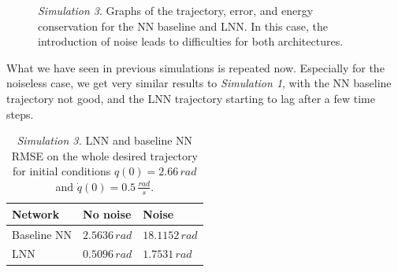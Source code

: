 \documentclass[a4paper]{article}
\begin{document}
\begin{figure}
    \centering
    \qquad
    \caption{\textit{Simulation 3}. Graphs of the trajectory, error, and energy conservation for the NN baseline and LNN. In this case, the introduction of noise leads to difficulties for both architectures.}
    \label{fig:rigid_150degrees_05rads}
\end{figure}

What we have seen in previous simulations is repeated now. Especially for the noiseless case, we get very similar results to \textit{Simulation 1}, with the NN baseline trajectory not good, and the LNN trajectory starting to lag after a few time steps.

\begin{table}
    \centering
    \caption{\textit{Simulation 3.} LNN and baseline NN RMSE on the whole desired trajectory for initial conditions $q(0)=2.66\, rad$ and $\dot{q}(0)=0.5\, \frac{rad}{s}.$}
    \begin{tabular}{P{2.5cm}P{2.5cm}P{2.5cm}} 
    \hline\hline
    \textbf{Network} & \textbf{No noise} & \textbf{Noise} \\ 
    \hline
     Baseline NN & $2.5636\, rad$ & $18.1152\, rad$\\
    \hline
     LNN & $0.5096\, rad$& $1.7531\, rad$\\
    \hline\hline
    \end{tabular}
    \label{tab:rigid_rmse_3}    
\end{table}
\end{document}
